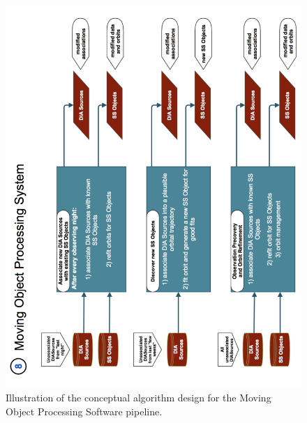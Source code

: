 \documentclass[SE,lsstdraft,toc]{lsstdoc}
\begin{document}
\begin{figure}[!t]
    \centering
    \vskip -2.3in
    \includegraphics[scale=0.50, angle=270]{gliffy/MOPS-Level0}
    \vskip -0.1in
    \caption{Illustration of the conceptual algorithm design for the Moving Object Processing Software pipeline. \label{fig:Pipe8}}
\end{figure}
\end{document}
